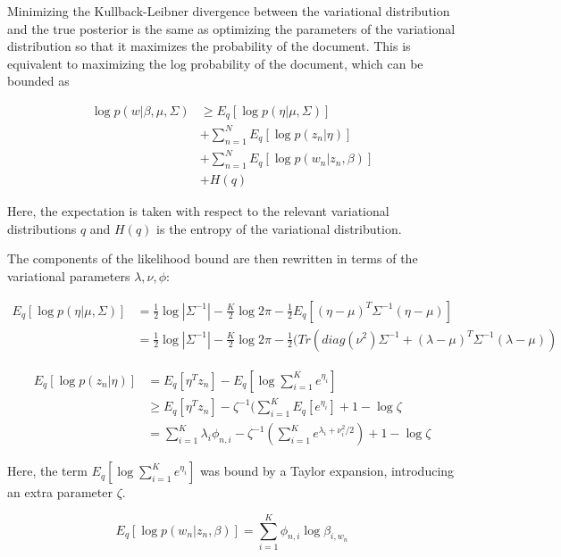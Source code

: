 \documentclass[12pt,a4paper,twoside,openright]{report}
\begin{document}
Minimizing the Kullback-Leibner divergence between the variational distribution and the true posterior is the same as optimizing the parameters of the variational distribution so that it maximizes the probability of the document. This is equivalent to maximizing the log probability of the document, which can be bounded as

\begin{align}\label{eq:likelihood-bound}
\log p(w | \beta, \mu, \Sigma) & \geq E_q[\log p(\eta|\mu, \Sigma)] \\
& + \sum\limits_{n=1}^N E_q[\log p(z_n | \eta)] \\
& + \sum\limits_{n=1}^N E_q[\log p(w_n | z_n, \beta)] \\
& + \mathit{H}(q)
\end{align}

Here, the expectation is taken with respect to the relevant variational distributions $q$ and $\mathit{H}(q)$ is the entropy of the variational distribution.

The components of the likelihood bound are then rewritten in terms of the variational parameters $\lambda, \nu, \phi$:

\begin{align}
E_q[\log p(\eta|\mu, \Sigma)] & = \frac{1}{2} \log |\Sigma^{-1}| - \frac{K}{2} \log 2 \pi - \frac{1}{2}E_q[(\eta - \mu)^T\Sigma^{-1}(\eta - \mu)] \\
& = \frac{1}{2} \log |\Sigma^{-1}| - \frac{K}{2} \log 2 \pi - \frac{1}{2}(\mathit{Tr}(\mathit{diag}(\nu^2)\Sigma^{-1} + (\lambda - \mu)^T\Sigma^{-1}(\lambda - \mu))
\end{align}

\begin{align}
E_q[\log p(z_n | \eta)] & = E_q[\eta^Tz_n] - E_q[\log \sum\limits_{i=1}^K e^{\eta_i}] \\
& \geq E_q[\eta^Tz_n] - \zeta^{-1}(\sum\limits_{i=1}^KE_q[e^{\eta_i}] + 1 - \log\zeta \\
& = \sum\limits_{i=1}^K\lambda_i\phi_{n, i} - \zeta^{-1}(\sum\limits_{i=1}^Ke^{\lambda_i + \nu_i^2 / 2}) + 1 - \log\zeta
\end{align}

Here, the term $E_q[\log \sum\limits_{i=1}^K e^{\eta_i}]$ was bound by a Taylor expansion, introducing an extra parameter $\zeta$.

\begin{equation}
E_q[\log p(w_n | z_n, \beta)] = \sum\limits_{i=1}^K\phi_{n,i}\log\beta_{i, w_n}
\end{equation}
\end{document}
